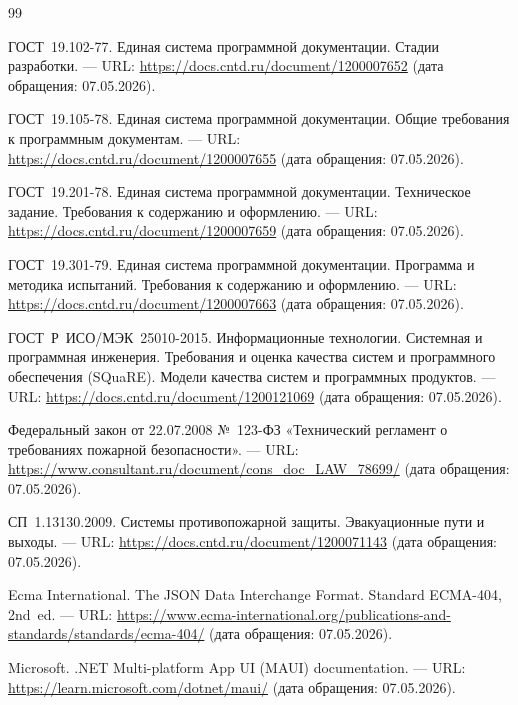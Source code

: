 
\begin{thebibliography}{99}
	
	
	 ГОСТ~19.102-77. Единая система программной документации. Стадии разработки. --- URL: \url{https://docs.cntd.ru/document/1200007652} (дата обращения: 07.05.2026).
	
	 ГОСТ~19.105-78. Единая система программной документации. Общие требования к программным документам. --- URL: \url{https://docs.cntd.ru/document/1200007655} (дата обращения: 07.05.2026).
	
	 ГОСТ~19.201-78. Единая система программной документации. Техническое задание. Требования к содержанию и оформлению. --- URL: \url{https://docs.cntd.ru/document/1200007659} (дата обращения: 07.05.2026).
	
	 ГОСТ~19.301-79. Единая система программной документации. Программа и методика испытаний. Требования к содержанию и оформлению. --- URL: \url{https://docs.cntd.ru/document/1200007663} (дата обращения: 07.05.2026).
	
	 ГОСТ~Р~ИСО/МЭК~25010-2015. Информационные технологии. Системная и программная инженерия. Требования и оценка качества систем и программного обеспечения (SQuaRE). Модели качества систем и программных продуктов. --- URL: \url{https://docs.cntd.ru/document/1200121069} (дата обращения: 07.05.2026).
	
	 Федеральный закон от 22.07.2008 №~123-ФЗ «Технический регламент о требованиях пожарной безопасности». --- URL: \url{https://www.consultant.ru/document/cons_doc_LAW_78699/} (дата обращения: 07.05.2026).
	
	 СП~1.13130.2009. Системы противопожарной защиты. Эвакуационные пути и выходы. --- URL: \url{https://docs.cntd.ru/document/1200071143} (дата обращения: 07.05.2026).
	
	
	 Ecma International. The JSON Data Interchange Format. Standard ECMA-404, 2nd~ed. --- URL: \url{https://www.ecma-international.org/publications-and-standards/standards/ecma-404/} (дата обращения: 07.05.2026).
	
	 Microsoft. .NET Multi-platform App UI (MAUI) documentation. --- URL: \url{https://learn.microsoft.com/dotnet/maui/} (дата обращения: 07.05.2026).
	

\end{thebibliography}
